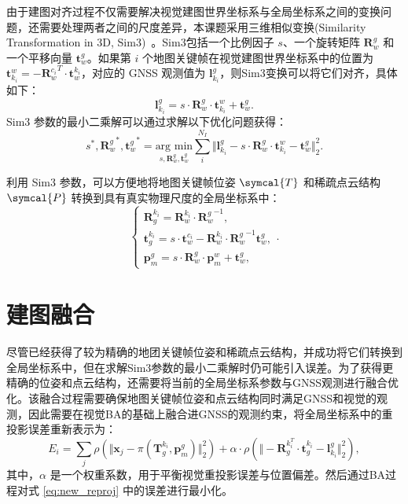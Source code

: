 由于建图对齐过程不仅需要解决视觉建图世界坐标系与全局坐标系之间的变换问题，还需要处理两者之间的尺度差异，本课题采用三维相似变换(Similarity Transformation in 3D, Sim3)~\cite{horn1987closed}。Sim3包括一个比例因子 $s$、一个旋转矩阵 $\symbf{R}_w^g$ 和一个平移向量 $\symbf{t}_w^g$。如果第 $i$ 个地图关键帧在视觉建图世界坐标系中的位置为 $\symbf{t}_{k_i}^{w} = -{\symbf{R}_w^{c_i}}^T \cdot \symbf{t}_w^{k_i}$，对应的 GNSS 观测值为 $\symbf{l}_{k_i}^g$，则Sim3变换可以将它们对齐，具体如下：
\begin{equation}
    \symbf{l}_{k_i}^g = s \cdot \symbf{R}_w^g \cdot \symbf{t}_{k_i}^{w} + \symbf{t}_w^g.
\end{equation}
Sim3 参数的最小二乘解可以通过求解以下优化问题获得：
\begin{equation}
  s^*, {\symbf{R}_w^g}^*, {\symbf{t}_w^g}^* = \underset{s,\symbf{R}_w^g,\symbf{t}_w^g}{\text{arg min}} \sum_i^{N_I} \Vert \symbf{l}_{k_i}^g - s \cdot \symbf{R}_w^g \cdot \symbf{t}_{k_i}^{w} - \symbf{t}_w^g \Vert_2^2.
\end{equation}

利用 Sim3 参数，可以方便地将地图关键帧位姿 $\symcal{T}$ 和稀疏点云结构 $\symcal{P}$ 转换到具有真实物理尺度的全局坐标系中：
\begin{equation}
\begin{cases}
    \symbf{R}^{k_i}_g = {\symbf{R}^{k_i}_{w}} \cdot {\symbf{R}_w^g}^{-1}, \\
    \symbf{t}^{k_i}_g = s \cdot \symbf{t}_w^{c_i} - {\symbf{R}^{k_i}_{w}} \cdot {\symbf{R}^{g}_{w}}^{-1} \symbf{t}_w^g, \\
    \symbf{p}_m^g = s \cdot \symbf{R}_w^g \cdot \symbf{p}_{m}^{w} + \symbf{t}_w^g,
\end{cases}.
\end{equation}

\section{建图融合}
\label{sec:map_fusion}

尽管已经获得了较为精确的地团关键帧位姿和稀疏点云结构，并成功将它们转换到全局坐标系中，但在求解Sim3参数的最小二乘解时仍可能引入误差。为了获得更精确的位姿和点云结构，还需要将当前的全局坐标系参数与GNSS观测进行融合优化。该融合过程需要确保地图关键帧位姿和点云结构同时满足GNSS和视觉的观测，因此需要在视觉BA的基础上融合进GNSS的观测约束，将全局坐标系中的重投影误差重新表示为：
\begin{equation}
\label{eq:new_reproj}
    E_i = \sum_{j}\rho\left(\Vert \symbf{x}_j - \pi(\symbf{T}^{k_i}_g, \symbf{p}_{m}^{g}) \Vert ^2_2\right) 
    + \alpha \cdot \rho\left(\Vert -\symbf{R}_g^{k_i^T}\cdot\symbf{t}_g^{k_i} - \symbf{l}_{k_i}^g \Vert_2^2\right),
\end{equation}
其中，$\alpha$ 是一个权重系数，用于平衡视觉重投影误差与位置偏差。然后通过BA过程对式 \eqref{eq:new_reproj} 中的误差进行最小化。

